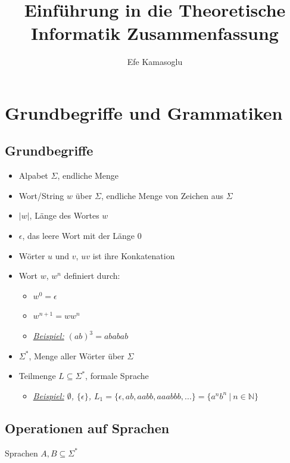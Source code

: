 \documentclass[ieeetran]{article}
\title{Einführung in die Theoretische Informatik Zusammenfassung}
\author{Efe Kamasoglu}
\begin{document}
\maketitle

\pagebreak

\section{Grundbegriffe und Grammatiken} %
\label{sub:grundbegriffe_und_grammatiken}

\subsection{Grundbegriffe} %
\label{sub:grundbegriffe}
\begin{itemize}
  \item Alpabet $\Sigma$, endliche Menge
  \item Wort/String $w$ über $\Sigma$, endliche Menge von Zeichen aus $\Sigma$
\item $|w|$, Länge des Wortes $w$
\item $\epsilon$, das leere Wort mit der Länge 0
\item Wörter $u$ und $v$, $uv$ ist ihre Konkatenation
\item Wort $w$, $w^n$ definiert durch:
	\begin{itemize}
	  \item $w^0 = \epsilon$
	  \item $w^{n + 1} = ww^n$
	  \item \textit{\underline{Beispiel:} $(ab)^3 = ababab$}
         
	\end{itemize}

\item $\Sigma ^*$, Menge aller Wörter über $\Sigma$
\item Teilmenge $L \subseteq \Sigma ^*$, formale Sprache
	\begin{itemize}
		\item \textit{\underline{Beispiel:} $\emptyset$, $\{\epsilon\}$, $L_1 = \{\epsilon, ab, aabb, aaabbb, ... \} = \{a^nb^n \ | \ n \in \mathbb{N} \}$}
	\end{itemize}
\end{itemize}

\subsection{Operationen auf Sprachen} %
\label{sub:operationen_auf_sprachen}
Sprachen $A, B \subseteq \Sigma ^*$
\end{document}
